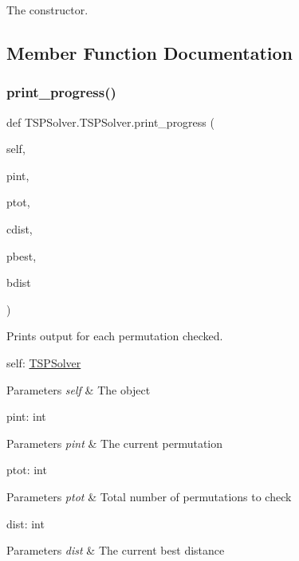 The constructor. 



\subsection{Member Function Documentation}
\mbox{\label{classTSPSolver_1_1TSPSolver_a3432ac3c40a016a0b4bf72d4e75d4a7f}} 
\subsubsection{\texorpdfstring{print\+\_\+progress()}{print\_progress()}}
{\footnotesize\ttfamily def T\+S\+P\+Solver.\+T\+S\+P\+Solver.\+print\+\_\+progress (\begin{DoxyParamCaption}\item[{}]{self,  }\item[{}]{pint,  }\item[{}]{ptot,  }\item[{}]{cdist,  }\item[{}]{pbest,  }\item[{}]{bdist }\end{DoxyParamCaption})}



Prints output for each permutation checked. 

self\+: \hyperlink{classTSPSolver_1_1TSPSolver}{T\+S\+P\+Solver} 
\begin{DoxyParams}{Parameters}
{\em self} & The object\\
\hline
\end{DoxyParams}
pint\+: int 
\begin{DoxyParams}{Parameters}
{\em pint} & The current permutation\\
\hline
\end{DoxyParams}
ptot\+: int 
\begin{DoxyParams}{Parameters}
{\em ptot} & Total number of permutations to check\\
\hline
\end{DoxyParams}
dist\+: int 
\begin{DoxyParams}{Parameters}
{\em dist} & The current best distance \\
\hline
\end{DoxyParams}
\mbox{\label{classTSPSolver_1_1TSPSolver_ac5d8950f2349d0d1f98c810e8d43c6cc}} 
